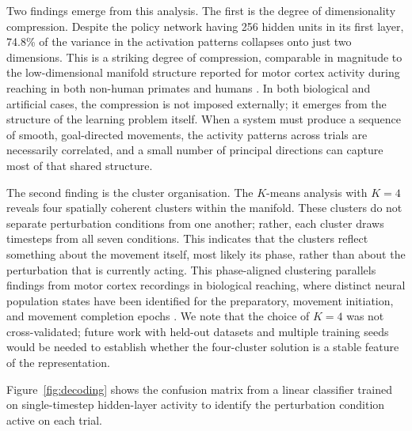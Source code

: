 \documentclass{article}
\newcommand{\PCAVarTotal}{74.8\%}
\begin{document}
Two findings emerge from this analysis.
The first is the degree of dimensionality compression.
Despite the policy network having 256 hidden units in its first layer,
\PCAVarTotal{} of the variance in the activation patterns collapses onto
just two dimensions.
This is a striking degree of compression, comparable in magnitude to
the low-dimensional manifold structure reported for motor cortex activity
during reaching in both non-human primates and humans
\citep{Churchland2012,Shenoy2013,Cunningham2014,Gallego2017,Sadtler2014,Elsayed2016}.
In both biological and artificial cases, the compression is not imposed
externally; it emerges from the structure of the learning problem itself.
When a system must produce a sequence of smooth, goal-directed movements,
the activity patterns across trials are necessarily correlated, and a
small number of principal directions can capture most of that shared
structure.

The second finding is the cluster organisation.
The $K$-means analysis with $K=4$ reveals four spatially coherent clusters
within the manifold.
These clusters do not separate perturbation conditions from one another;
rather, each cluster draws timesteps from all seven conditions.
This indicates that the clusters reflect something about the movement itself,
most likely its phase, rather than about the perturbation that is currently
acting.
This phase-aligned clustering parallels findings from motor cortex
recordings in biological reaching, where distinct neural population states
have been identified for the preparatory, movement initiation, and
movement completion epochs \citep{Churchland2012,Shenoy2013,Kaufman2014,Perich2018}.
We note that the choice of $K=4$ was not cross-validated; future work
with held-out datasets and multiple training seeds would be needed to
establish whether the four-cluster solution is a stable feature of the
representation.

Figure~\ref{fig:decoding} shows the confusion matrix from a linear
classifier trained on single-timestep hidden-layer activity to identify
the perturbation condition active on each trial.
\end{document}
